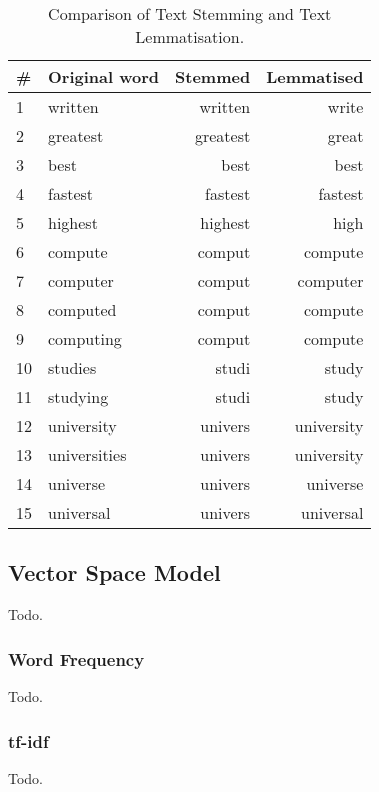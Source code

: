\begin{table}[h]
    \centering
    \begin{tabular}{|l|l|r|r|}
    \hline
    \textbf{\#} & \textbf{Original word} & \textbf{Stemmed} & \textbf{Lemmatised} \\ \hline
    1 & written & written & write \\ \hline
    2 & greatest & greatest & great \\ \hline
    3 & best & best & best \\ \hline
    4 & fastest & fastest & fastest \\ \hline
    5 & highest & highest & high \\ \hline
    6 & compute & comput & compute \\ \hline
    7 & computer & comput & computer \\ \hline
    8 & computed & comput & compute \\ \hline
    9 & computing & comput & compute \\ \hline
    10 & studies & studi & study \\ \hline
    11 & studying & studi & study \\ \hline
    12 & university & univers & university \\ \hline
    13 & universities & univers & university \\ \hline
    14 & universe & univers & universe \\ \hline
    15 & universal & univers & universal \\ \hline
    \end{tabular}
    \caption{Comparison of Text Stemming and Text Lemmatisation.}
    \label{tab:comparison_stemming_lemmatisation}
\end{table}


\subsection{Vector Space Model}
Todo.

\subsubsection{Word Frequency}
Todo.

\subsubsection{tf-idf}
Todo.

